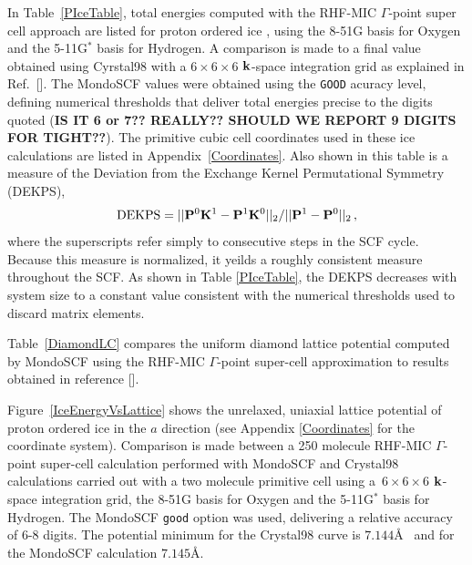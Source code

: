 \documentclass[prb,aps,nobibnotes,twocolumn,doublespace,twocolumngrid,superbib]{revtex4}
\begin{document}
In Table~\ref{PIceTable}, total energies computed with the RHF-MIC $\Gamma$-point
super cell approach are listed for proton ordered ice \cite{SCasassa97}, using the 8-51G basis 
for Oxygen and the 5-11G$^*$ basis for Hydrogen.  A comparison is made to a final 
value obtained using {\sc Cyrstal98} with a $6\times6\times6$ ${\bf k}$-space integration grid
as explained in Ref.~[].  The {\sc MondoSCF} values were obtained 
using the {\tt GOOD} acuracy level, defining numerical thresholds that deliver total energies
precise to the digits quoted ({\bf IS IT 6 or 7?? REALLY?? SHOULD WE REPORT 9 DIGITS FOR TIGHT??}).  
The primitive cubic cell coordinates used in these ice calculations are listed in Appendix~\ref{Coordinates}.   
Also shown in this table is a measure of the 
Deviation from the Exchange Kernel Permutational Symmetry (DEKPS),
\begin{equation}
{\rm DEKPS} = || {\bf P}^0 {\bf K}^1-{\bf P}^1 {\bf K}^0 ||_2/|| {\bf P}^1 - {\bf P}^0||_2 \, ,
\end{equation}
where the superscripts refer simply to consecutive steps in the SCF cycle.  Because this measure
is normalized, it yeilds a roughly consistent measure throughout the SCF.  As shown in Table \ref{PIceTable},
the DEKPS decreases with system size to a constant value consistent with the numerical thresholds used to 
discard matrix elements.   

Table~\ref{DiamondLC}  compares the uniform diamond lattice potential computed 
by MondoSCF using the RHF-MIC $\Gamma$-point super-cell approximation to results obtained in 
reference [].

Figure~\ref{IceEnergyVsLattice} shows the unrelaxed, uniaxial lattice potential of 
proton ordered ice \cite{} in the $a$ direction (see Appendix \ref{Coordinates} for the coordinate system).  
Comparison is made between a 250 molecule RHF-MIC $\Gamma$-point super-cell calculation performed 
with {\sc MondoSCF} and {\sc Crystal98} calculations carried out with a two molecule primitive
cell using a~$6\times6\times6$ ${\bf k}$-space integration grid, the 8-51G basis for Oxygen and the 
5-11G${^*}$ basis for Hydrogen.  The {\sc MondoSCF} {\tt good} option was used, delivering 
a relative accuracy of 6-8 digits. The potential minimum for the {\sc Crystal98} curve is $7.144$\AA~
and  for the {\sc MondoSCF} calculation $7.145$\AA.
\end{document}
